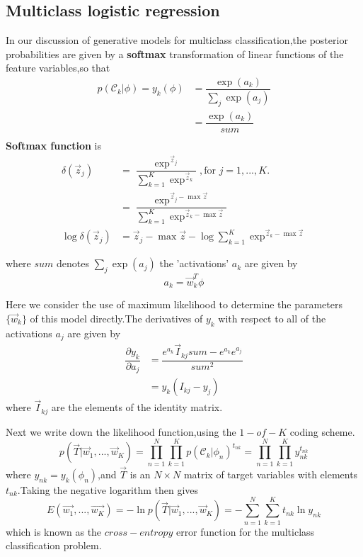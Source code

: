 \subsection{Multiclass logistic regression}
In our discussion of generative models for multiclass classification,the posterior probabilities are given by a \textbf{softmax} transformation of linear functions of the feature variables,so that
\begin{align}
p(\mathcal{C}_k|\phi) = y_k(\phi) &= \dfrac{\exp(a_k)}{\sum_j\exp(a_j)}\\
&=\dfrac{\exp(a_k)}{sum} \\
\end{align}
\textbf{Softmax function} is 
\begin{align}
\delta(\vec{z}_j) &= \dfrac{\exp^{\vec{z}_j}}{\sum_{k=1}^{K}\exp^{\vec{z}_k}},\text{for } j=1,...,K.  \\
&=\dfrac{\exp^{\vec{z}_j-\max{\vec{z}}}}{\sum_{k=1}^{K}\exp^{\vec{z}_k - \max{\vec{z}}}} \\
\log \delta(\vec{z}_j) &= \vec{z}_j-\max{\vec{z}}-\log\sum_{k=1}^{K}\exp^{\vec{z}_k - \max{\vec{z}}}
\end{align}

where $sum$ denotes $\sum_j\exp(a_j)$ the 'activations' $a_k$ are given by
\begin{equation}
a_k = \vec{w}_k^T\phi
\end{equation}
	
Here we consider the use of maximum likelihood to determine the parameters $\{\vec{w}_k\}$ of this model directly.The derivatives of $y_k$ with respect to all of the activations $a_j$ are given by 
\begin{align}
\dfrac{\partial y_k}{\partial a_j} 
&=\dfrac{e^{a_k}\vec{I}_{kj}sum-e^{a_k}e^{a_j}}{sum^2} \\
&=y_k(I_{kj}-y_j)
\end{align}
where $\vec{I}_{kj}$ are the elements of the identity matrix.

Next we write down the likelihood function,using the $1-of-K$ coding scheme.
\begin{equation}
p(\vec{T}|\vec{w}_1,...,\vec{w}_K)=
\prod_{n=1}^{N}\prod_{k=1}^{K}p(\mathcal{C}_k|\phi_n)^{t_{nk}}
=\prod_{n=1}^{N}\prod_{k=1}^{K}y_{nk}^{t_{nk}}
\end{equation}
where $y_{nk}=y_k(\phi_n)$,and $\vec{T}$ is an $N\times N$ matrix of target variables with elements $t_{nk}$.Taking the negative logarithm then gives
\begin{equation}
E(\vec{w_1},...,\vec{w_K})=-\ln p(\vec{T}|\vec{w}_1,...,\vec{w}_K)
=-\sum_{n=1}^{N}\sum_{k=1}^{K}t_{nk}\ln y_{nk}
\end{equation}
which is known as the $cross-entropy$ error function for the multiclass classification problem.

